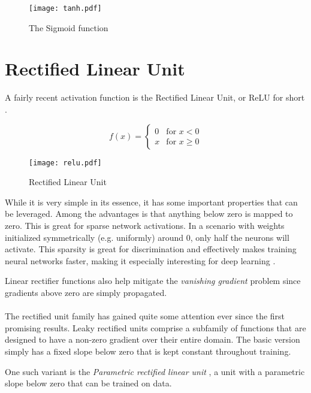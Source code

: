 \begin{figure}[h]
\center
\texttt{[image: tanh.pdf]}
\caption{The Sigmoid function}
\label{fig.ml.htan}
\end{figure}

\section{Rectified Linear Unit}
\label{sec:relu}
A fairly recent activation function is the
Rectified Linear Unit, or ReLU for short
\parencite{Nair2010}.

\begin{equation}
\label{eq.relu}
f(x) =
\begin{cases}
0 & \text{for } x < 0 \\
x & \text{for } x \geq 0
\end{cases}
\end{equation}

\begin{figure}[h]
\center
\texttt{[image: relu.pdf]}
\caption{Rectified Linear Unit}
\label{fig.ml.relu}
\end{figure}

While it is very simple in its essence,
it has some important properties
that can be leveraged.
Among the advantages is that anything
below zero is mapped to zero.
This is great for sparse
network activations.
In a scenario with weights initialized
symmetrically (e.g. uniformly) around 0,
only half the neurons will activate.
This sparsity is great for discrimination
and effectively makes training
neural networks faster,
making it especially interesting for
deep learning
\parencite{Y.2015a}.

Linear rectifier functions also help mitigate
the \textit{vanishing gradient} problem %
since gradients above zero
are simply propagated.

\paragraph{}
The rectified unit family has gained quite some attention
ever since the first promising results.
Leaky rectified units comprise a subfamily
of functions that are designed to have a non-zero
gradient over their entire domain.
The basic version simply
has a fixed slope below zero
that is kept constant throughout training.

One such variant is the
\textit{Parametric rectified linear unit}
\parencite{He2015a},
a unit with a parametric slope below zero
that can be trained on data.

